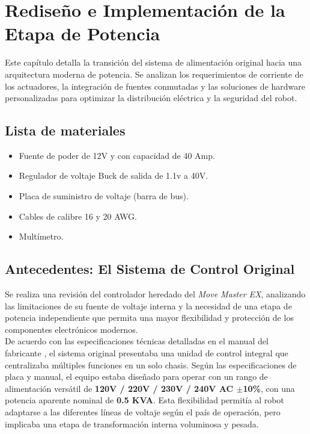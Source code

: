 \chapter{Rediseño e Implementación de la Etapa de Potencia}
\lineaLateral

\begin{resumenCapitulo}
	Este capítulo detalla la transición del sistema de alimentación original hacia una arquitectura moderna de potencia. Se analizan los requerimientos de corriente de los actuadores, la integración de fuentes conmutadas y las soluciones de hardware personalizadas para optimizar la distribución eléctrica y la seguridad del robot.
\end{resumenCapitulo}
\clearpage
\section{Lista de materiales}
\begin{itemize}
	\item Fuente de poder de 12V y con capacidad de 40 Amp.
	\item Regulador de voltaje Buck de salida de 1.1v a 40V.
	\item Placa de suministro de voltaje (barra de bus).
	\item Cables de calibre 16 y 20 AWG.
	\item Multímetro.
\end{itemize}

\section{Antecedentes: El Sistema de Control Original}
Se realiza una revisión del controlador heredado del \textit{Move Master EX}, analizando las limitaciones de su fuente de voltaje interna y la necesidad de una etapa de potencia independiente que permita una mayor flexibilidad y protección de los componentes electrónicos modernos. \\
De acuerdo con las especificaciones técnicas detalladas en el manual del fabricante \cite{manualMitsubishi}, el sistema original presentaba una unidad de control integral que centralizaba múltiples funciones en un solo chasis. Según las especificaciones de placa y manual, el equipo estaba diseñado para operar con un rango de alimentación versátil de \textbf{120V / 220V / 230V / 240V AC $\pm$10\%}, con una potencia aparente nominal de \textbf{0.5 KVA}. Esta flexibilidad permitía al robot adaptarse a las diferentes líneas de voltaje según el país de operación, pero implicaba una etapa de transformación interna voluminosa y pesada. \\

